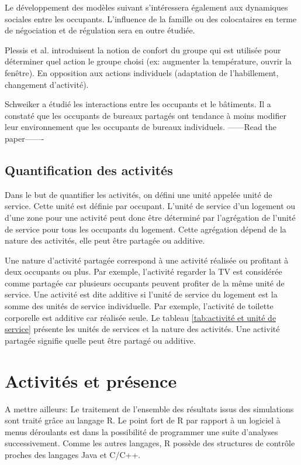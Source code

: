 Le développement des modèles suivant s'intéressera également aux dynamiques sociales entre les occupants. L'influence de la famille ou des colocataires en terme de négociation et de régulation sera en outre étudiée.

Plessis et al. \cite{Plessis-14} introduisent la notion de confort du groupe qui est utilisée pour déterminer quel action le groupe choisi (ex: augmenter la température, ouvrir la fenêtre). En opposition aux actions individuels (adaptation de l'habillement, changement d'activité).

Schweiker \cite{Schweiker-16} a étudié les interactions entre les occupants et le bâtiments. Il a constaté que les occupants de bureaux partagés ont tendance à moins modifier leur environnement que les occupants de bureaux individuels. ------Read the paper-------

\subsection{Quantification des activités}

Dans le but de quantifier les activités, on défini une unité appelée unité de service. Cette unité est définie par occupant. L'unité de service d'un logement ou d'une zone pour une activité peut donc être déterminé par l'agrégation de l'unité de service pour tous les occupants du logement. Cette agrégation dépend de la nature des activités, elle peut être partagée ou additive.

Une nature d'activité partagée correspond à une activité réalisée ou profitant à deux occupants ou plus. Par exemple, l'activité regarder la TV est considérée comme partagée car plusieurs occupants peuvent profiter de la même unité de service. Une activité est dite additive si l'unité de service du logement est la somme des unités de service individuelle. Par exemple, l'activité de toilette corporelle est additive car réalisée seule. Le tableau \ref{tab:activité et unité de service} présente les unités de services et la nature des activités. Une activité partagée signifie quelle peut être partagé ou additive.

\section{Activités et présence}

A mettre ailleurs: Le traitement de l'ensemble des résultats issus des simulations sont traité grâce au langage R. Le point fort de R par rapport à un logiciel à menus déroulants est dans la possibilité de programmer une suite d'analyses successivement. Comme les autres langages, R possède des structures de contrôle proches des langages Java et C/C++.


